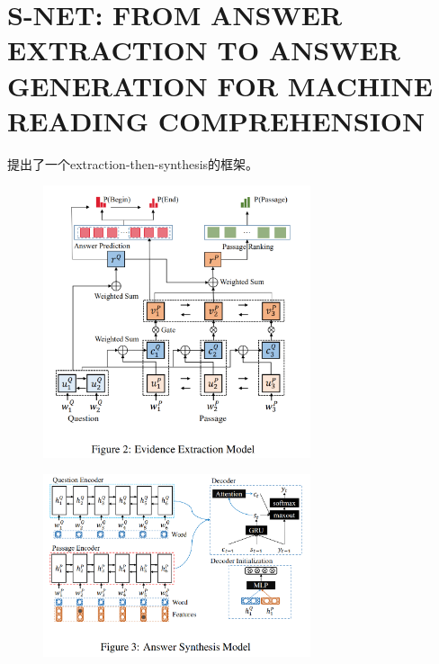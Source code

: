 \documentclass[a4paper,UTF8]{article}
\numberwithin{equation}{section}
\begin{document}
\section{S-NET: FROM ANSWER EXTRACTION TO ANSWER GENERATION FOR MACHINE READING COMPREHENSION}
提出了一个extraction-then-synthesis的框架。
\begin{figure}[H]
	\centering
	\includegraphics[width=0.7\textwidth]{4-1.png}
\end{figure}
\begin{figure}[H]
	\centering
	\includegraphics[width=0.7\textwidth]{4-2.png}
\end{figure}
\newpage
\end{document}
